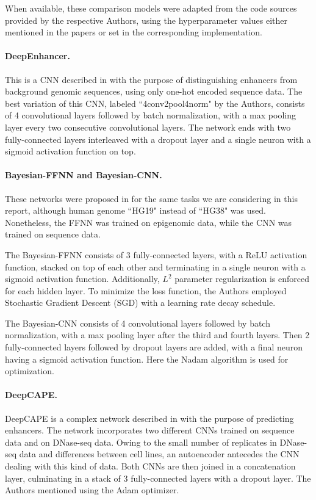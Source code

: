 \documentclass{article}
\begin{document}
When available, these comparison models were adapted from the code sources provided by the respective Authors, using the hyperparameter values either mentioned in the papers or set in the corresponding implementation.

\paragraph{DeepEnhancer.} This is a CNN described in \cite{min17} with the purpose of distinguishing enhancers from background genomic sequences, using only one-hot encoded sequence data. The best variation of this CNN, labeled  “4conv2pool4norm" by the Authors, consists of 4 convolutional layers followed by batch normalization, with a max pooling layer every two consecutive convolutional layers. The network ends with two fully-connected layers interleaved with a dropout layer and a single neuron with a sigmoid activation function on top.

\paragraph{Bayesian-FFNN and Bayesian-CNN.} These networks were proposed in \cite{cappelletti20} for the same tasks we are considering in this report, although human genome  “HG19" instead of  “HG38" was used. Nonetheless, the FFNN was trained on epigenomic data, while the CNN was trained on sequence data.

The Bayesian-FFNN consists of 3 fully-connected layers, with a ReLU activation function, stacked on top of each other and terminating in a single neuron with a sigmoid activation function. Additionally, $L^2$ parameter regularization is enforced for each hidden layer. To minimize the loss function, the Authors employed Stochastic Gradient Descent (SGD) with a learning rate decay schedule.

The Bayesian-CNN consists of 4 convolutional layers followed by batch normalization, with a max pooling layer after the third and fourth layers. Then 2 fully-connected layers followed by dropout layers are added, with a final neuron having a sigmoid activation function. Here the Nadam algorithm is used for optimization.

\paragraph{DeepCAPE.} DeepCAPE is a complex network described in \cite{chen21} with the purpose of predicting enhancers. The network incorporates two different CNNs trained on sequence data and on DNase-seq data. Owing to the small number of replicates in DNase-seq data and differences between cell lines, an autoencoder antecedes the CNN dealing with this kind of data. Both CNNs are then joined in a concatenation layer, culminating in a stack of 3 fully-connected layers with a dropout layer. The Authors mentioned using the Adam \cite{kingma15} optimizer.
\end{document}
